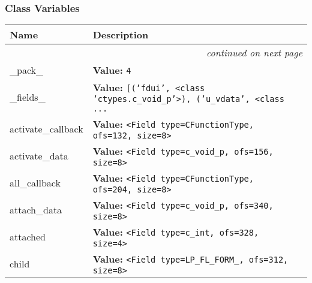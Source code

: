 
  \subsubsection{Class Variables}

    \vspace{-1cm}
\hspace{\varindent}\begin{longtable}{|p{\varnamewidth}|p{\vardescrwidth}|l}
\cline{1-2}
\cline{1-2} \centering \textbf{Name} & \centering \textbf{Description}& \\
\cline{1-2}
\endhead\cline{1-2}\multicolumn{3}{r}{\small\textit{continued on next page}}\\\endfoot\cline{1-2}
\endlastfoot\raggedright \_\-p\-a\-c\-k\-\_\- & \raggedright \textbf{Value:} 
{\tt 4}&\\
\cline{1-2}
\raggedright \_\-f\-i\-e\-l\-d\-s\-\_\- & \raggedright \textbf{Value:} 
{\tt \texttt{[}\texttt{(}\texttt{'}\texttt{fdui}\texttt{'}\texttt{, }{\textless}class 'ctypes.c\_void\_p'{\textgreater}\texttt{)}\texttt{, }\texttt{(}\texttt{'}\texttt{u\_vdata}\texttt{'}\texttt{, }{\textless}class \texttt{...}}&\\
\cline{1-2}
\raggedright a\-c\-t\-i\-v\-a\-t\-e\-\_\-c\-a\-l\-l\-b\-a\-c\-k\- & \raggedright \textbf{Value:} 
{\tt {\textless}Field type=CFunctionType, ofs=132, size=8{\textgreater}}&\\
\cline{1-2}
\raggedright a\-c\-t\-i\-v\-a\-t\-e\-\_\-d\-a\-t\-a\- & \raggedright \textbf{Value:} 
{\tt {\textless}Field type=c\_void\_p, ofs=156, size=8{\textgreater}}&\\
\cline{1-2}
\raggedright a\-l\-l\-\_\-c\-a\-l\-l\-b\-a\-c\-k\- & \raggedright \textbf{Value:} 
{\tt {\textless}Field type=CFunctionType, ofs=204, size=8{\textgreater}}&\\
\cline{1-2}
\raggedright a\-t\-t\-a\-c\-h\-\_\-d\-a\-t\-a\- & \raggedright \textbf{Value:} 
{\tt {\textless}Field type=c\_void\_p, ofs=340, size=8{\textgreater}}&\\
\cline{1-2}
\raggedright a\-t\-t\-a\-c\-h\-e\-d\- & \raggedright \textbf{Value:} 
{\tt {\textless}Field type=c\_int, ofs=328, size=4{\textgreater}}&\\
\cline{1-2}
\raggedright c\-h\-i\-l\-d\- & \raggedright \textbf{Value:} 
{\tt {\textless}Field type=LP\_FL\_FORM\_, ofs=312, size=8{\textgreater}}&\\

\end{longtable}
